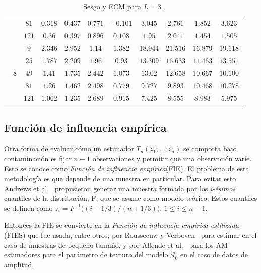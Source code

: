 \begin{table}[hbt]
\begin{tabular}{cc|cccc|cccc}
		& $81$	& $0.318$	& $0.437$	& $0.771$	 			 & \textbf{$-0.101$}	& $3.045$	    & $2.761$	    & \textbf{$1.852$}	 & $3.623$ \\ 
		& $121$	& $0.36$	& $0.397$	& $0.896$	 			 & \textbf{$0.108$}	    & $1.95$	    & $2.041$	    & \textbf{$1.454$}	 & \textbf{$1.505$} \\ 
		\cmidrule(r){1-6}
		\cmidrule(r){7-10}									
		\multirow{5 }{*}{$-8$}									
		& $9$	& $2.346$	& $2.952$ & \textbf{$1.14$}     	& $1.382$				& 18.944		& $21.516$	& \textbf{$16.879$}	 & $19.118$ \\ 
		& $25$	& $1.787$	& $2.209$	& \textbf{$1.96$}		& $0.93$				& $13.309$	 	& $16.633$	& \textbf{$11.463$}	 & $13.551$ \\ 
		& $49$	& $1.41$	& $1.735$	& $2.442$				& \textbf{$1.073$}		& $13.02$	    & $12.658$  & \textbf{$10.667$}	 & \textbf{$10.100$} \\ 
		& $81$	& $1.26$	& $1.462$	& $2.498$				& \textbf{$0.779$}		& $9.727$	    & $9.893$	& $10.468$	 		 & $10.278$  \\ 
		& $121$	& $1.062$	& $1.235$	& $2.689$				& \textbf{$0.915$}		& $7.425$	    & $8.555$	& $8.983$	         & \textbf{$5.975$}  \\ 
		\bottomrule									
	\end{tabular}										
	\caption{\label{SesgoyECMSinContConConstL=3} Sesgo y ECM para $L=3$.}									
\end{table}										

\subsection{Función de influencia empírica}

Otra forma de evaluar cómo un estimador $T_n(z_1; \ldots ; z_n)$ se comporta bajo contaminación es fijar $n-1$ observaciones y permitir que una observación varíe. Esto se conoce como \textit{Función de influencia empírica}(FIE). El problema de esta metodología es que depende de una muestra en particular. Para evitar esto Andrews et al.~\cite{Andrews1972} propusieron generar una muestra formada por los \textit{i-ésimos} cuantiles de la distribución, F, que se asume como modelo teórico. Estos cuantiles se definen como $z_i=F^{-1}\big((i-1/3)/(n+1/3) \big)$, $1\leq i\leq n-1$.

Entonces la FIE se convierte en la \textit{Función de influencia empírica estilizada} (FIES) que fue usada, entre otros, por Rousseeuw y Verboven~\cite{RousseeuwCSDA} para estimar en el caso de muestras de pequeño tamaño, y por Allende et al.~\cite{AllendeFreryetal:JSCS:05} para los AM estimadores para el parámetro de textura del modelo $\mathcal{G}_0$ en el caso de datos de amplitud.

